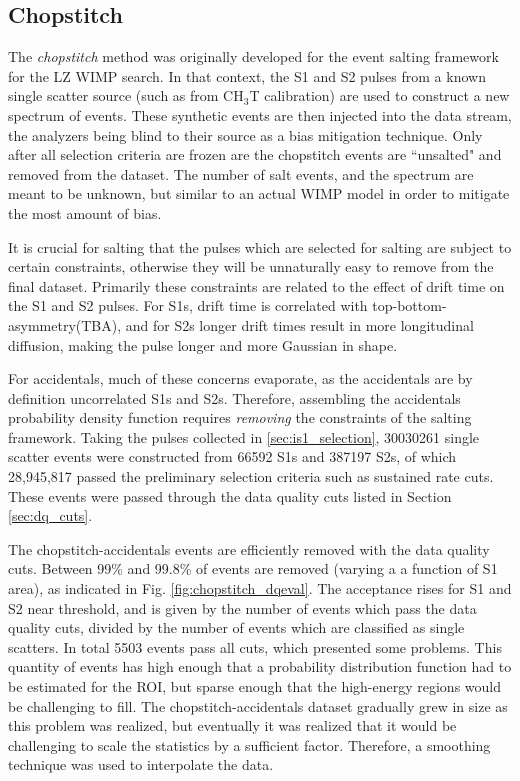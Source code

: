 \subsection{Chopstitch}
\label{sec:chopstitch}
The \textit{chopstitch} method was originally developed for the event salting framework for the LZ WIMP search\cite{mount_lux-zeplin_2017}.
In that context, the S1 and S2 pulses from a known single scatter source (such as from CH$_3$T calibration) are used  to construct a new spectrum of events.
These synthetic events are then injected into the data stream, the analyzers being blind to their source as a bias mitigation technique.
Only after all selection criteria are frozen are the chopstitch events are ``unsalted" and removed from the dataset.
The number of salt events, and the spectrum are meant to be unknown, but similar to an actual WIMP model in order to mitigate the most amount of bias.

It is crucial for salting that the pulses which are selected for salting are subject to certain constraints, otherwise they will be unnaturally easy to remove from the final dataset.
Primarily these constraints are related to the effect of drift time on the S1 and S2 pulses. 
For S1s, drift time is correlated with top-bottom-asymmetry(TBA), and for S2s longer drift times result in more longitudinal diffusion, making the pulse longer and more Gaussian in shape. 

For accidentals, much of these concerns evaporate, as the accidentals are by definition uncorrelated S1s and S2s.
Therefore, assembling the accidentals probability density function requires \textit{removing} the constraints of the salting framework.
Taking the pulses collected in \ref{sec:is1_selection}, 30030261 single scatter events were constructed from 66592 S1s and 387197 S2s, of which 28,945,817 passed the preliminary selection criteria such as sustained rate cuts.
These events were passed through the data quality cuts listed in Section \ref{sec:dq_cuts}.

The chopstitch-accidentals events are efficiently removed with the data quality cuts.
Between 99\% and 99.8\% of events are removed (varying a a function of S1 area), as indicated in Fig. \ref{fig:chopstitch_dqeval}.
The acceptance rises for S1 and S2 near threshold, and is given by the number of events which pass the data quality cuts, divided by the number of events which are classified as single scatters.
In total 5503 events pass all cuts, which presented some problems.
This quantity of events has high enough that a probability distribution function had to be estimated for the ROI, but sparse enough that the high-energy regions would be challenging to fill.
The chopstitch-accidentals dataset gradually grew in size as this problem was realized, but eventually it was realized that it would be challenging to scale the statistics by a sufficient factor.
Therefore, a smoothing technique was used to interpolate the data.

